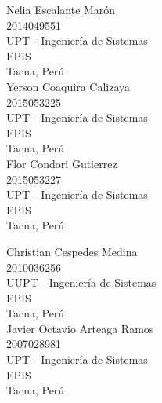 \documentclass[10pt,a4paper]{article}
\begin{document}
		\begin{multicols}{2}
			\small
			\begin{center}
				Nelia Escalante Marón\\
				2014049551\\
				UPT - Ingenierí­a de Sistemas\\
				EPIS\\
				Tacna, Perú\\
				\vspace{\baselineskip}
				Yerson Coaquira Calizaya\\
				2015053225\\
				UPT - Ingenierí­a de Sistemas\\  
				EPIS\\
				Tacna, Perú\\                 
				\vspace{\baselineskip}
				Flor Condori Gutierrez\\
				2015053227\\
				UPT - Ingenierí­a de Sistemas\\ 
				EPIS\\	
				Tacna, Perú\\                 
				\columnbreak
				
				\vspace{\baselineskip}
				Christian Cespedes Medina\\
				2010036256\\
				UUPT - Ingenierí­a de Sistemas\\  
				EPIS\\	
				Tacna, Perú\\                

				\vspace{\baselineskip}
				Javier Octavio Arteaga Ramos \\
				2007028981\\
				UPT - Ingenierí­a de Sistemas\\  
				EPIS\\	
				Tacna, Perú\\                 

			\end{center}
			\normalsize			
		\end{multicols}
		\vspace{\baselineskip}
\end{document}

